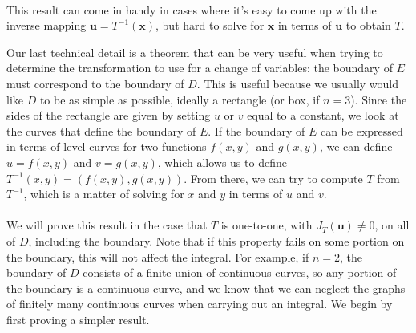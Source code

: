 \\

This result can come in handy in cases where it's easy to come up with the inverse mapping $\mathbf{u} = T^{-1}(\mathbf{x})$, but hard to solve for $\mathbf{x}$ in terms of $\mathbf{u}$ to obtain $T$.


Our last technical detail is a theorem that can be very useful when trying to determine the transformation to use for a change of variables: the boundary of $E$ must correspond to the boundary of $D$. This is useful because we usually would like $D$ to be as simple as possible, ideally a rectangle (or box, if $n=3$). Since the sides of the rectangle are given by setting $u$ or $v$ equal to a constant, we look at the curves that define the boundary of $E$. If the boundary of $E$ can be expressed in terms of level curves for two functions $f(x,y)$ and $g(x,y)$, we can define $u=f(x,y)$ and $v=g(x,y)$, which allows us to define $T^{-1}(x,y) = (f(x,y),g(x,y))$. From there, we can try to compute $T$ from $T^{-1}$, which is a matter of solving for $x$ and $y$ in terms of $u$ and $v$.\\

\\

We will prove this result in the case that $T$ is one-to-one, with $J_T(\mathbf{u})\neq 0$, on all of $D$, including the boundary. Note that if this property fails on some portion on the boundary, this will not affect the integral. For example, if $n=2$, the boundary of $D$ consists of a finite union of continuous curves, so any portion of the boundary is a continuous curve, and we know that we can neglect the graphs of finitely many continuous curves when carrying out an integral. We begin by first proving a simpler result.

